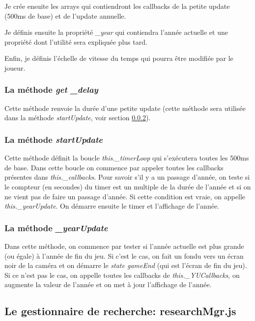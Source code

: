 \documentclass{article}
\begin{document}
		Je crée ensuite les arrays qui contiendront les callbacks de la petite update (500ms de base) et de l'update annuelle. 
		
		
		Je définis ensuite la propriété \textit{\_year} qui contiendra l'année actuelle et une propriété dont l'utilité sera expliquée plus tard.
		
		
		Enfin, je définis l'échelle de vitesse du temps qui pourra être modifiée par le joueur.
		
		\subsubsection{La méthode \textit{get \_delay}}
		Cette méthode renvoie la durée d'une petite update (cette méthode sera utilisée dans la méthode \textit{startUpdate}, voir section \ref{startUpdate}).
		
		\subsubsection{La méthode \textit{startUpdate}} \label{startUpdate}
		Cette méthode définit la boucle \textit{this.\_timerLoop} qui s'exécutera toutes les 500ms de base. Dans cette boucle on commence par appeler toutes les callbacks présentes dans \textit{this.\_callbacks}. 
		Pour savoir s'il y a un passage d'année, on teste si le compteur (en secondes) du timer est un multiple de la durée de l'année et si on ne vient pas de faire un passage d'année. Si cette condition est vraie, on appelle \textit{this.\_yearUpdate}.
		On démarre ensuite le timer et l'affichage de l'année.
		
		\subsubsection{La méthode \textit{\_yearUpdate}}
		Dans cette méthode,  on commence par tester si l'année actuelle est plus grande (ou égale) à l'année de fin du jeu. Si c'est le cas, on fait un fondu vers un écran noir de la caméra et on démarre le \textit{state gameEnd} (qui est l'écran de fin du jeu).
		Si ce n'est pas le cas, on appelle toutes les callbacks de \textit{this.\_YUCallbacks}, on augmente la valeur de l'année et on met à jour l'affichage de l'année.
		
		\subsection{Le gestionnaire de recherche: researchMgr.js} \label{researchMgr}
		
		
\end{document}
